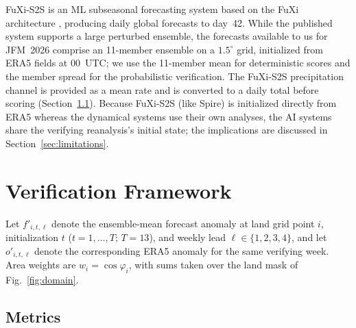 \documentclass[11pt]{article}
\begin{document}
FuXi-S2S is an ML subseasonal forecasting system based on the FuXi
architecture \citep{chen2024}, producing daily global forecasts to
day~42. While the published system supports a large perturbed ensemble,
the forecasts available to us for JFM~2026 comprise an 11-member ensemble
on a $1.5^{\circ}$ grid, initialized from ERA5 fields at 00~UTC; we use
the 11-member mean for deterministic scores and the member spread for the
probabilistic verification. The FuXi-S2S precipitation channel is
provided as a mean rate and is converted to a daily total before scoring
(Section~\ref{sec:metrics}). Because FuXi-S2S (like Spire) is initialized
directly from ERA5 whereas the dynamical systems use their own analyses,
the AI systems share the verifying reanalysis's initial state; the
implications are discussed in Section~\ref{sec:limitations}.

\section{Verification Framework}\label{sec:verif}

Let $f'_{i,t,\ell}$ denote the ensemble-mean forecast anomaly at land
grid point $i$, initialization $t$ ($t=1,\dots,T$; $T=13$), and weekly
lead $\ell\in\{1,2,3,4\}$, and let $o'_{i,t,\ell}$ denote the
corresponding ERA5 anomaly for the same verifying week. Area weights
are $w_i=\cos\varphi_i$, with sums taken over the land mask of
Fig.~\ref{fig:domain}.

\subsection{Metrics}\label{sec:metrics}
\end{document}
